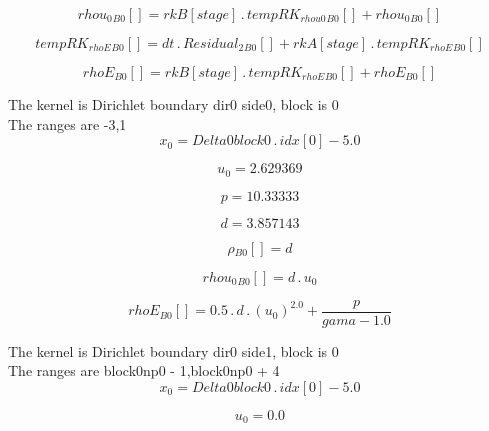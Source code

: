 \documentclass{article}
\begin{document}
\begin{dmath}{rhou_{0}{_{B0}}}[{}] = {rkB}[{stage}] \,.\, {tempRK_{rhou0}{_{B0}}}[{}] + {rhou_{0}{_{B0}}}[{}]\end{dmath}

\begin{dmath}{tempRK_{rhoE}{_{B0}}}[{}] = dt \,.\, {Residual_{2}{_{B0}}}[{}] + {rkA}[{stage}] \,.\, {tempRK_{rhoE}{_{B0}}}[{}]\end{dmath}

\begin{dmath}{rhoE{_{B0}}}[{}] = {rkB}[{stage}] \,.\, {tempRK_{rhoE}{_{B0}}}[{}] + {rhoE{_{B0}}}[{}]\end{dmath}

\noindent The kernel is Dirichlet boundary dir0 side0, block is 0\\\noindent The ranges are -3,1\\\begin{dmath}x_{0} = Delta0block0 \,.\, {idx}[{0}] - 5.0\end{dmath}

\begin{dmath}u_{0} = 2.629369\end{dmath}

\begin{dmath}p = 10.33333\end{dmath}

\begin{dmath}d = 3.857143\end{dmath}

\begin{dmath}{\rho{_{B0}}}[{}] = d\end{dmath}

\begin{dmath}{rhou_{0}{_{B0}}}[{}] = d \,.\, u_{0}\end{dmath}

\begin{dmath}{rhoE{_{B0}}}[{}] = 0.5 \,.\, d \,.\, \left(u_{0} \right)^{2.0} + \frac{p}{gama - 1.0}\end{dmath}

\noindent The kernel is Dirichlet boundary dir0 side1, block is 0\\\noindent The ranges are block0np0 - 1,block0np0 + 4\\\begin{dmath}x_{0} = Delta0block0 \,.\, {idx}[{0}] - 5.0\end{dmath}

\begin{dmath}u_{0} = 0.0\end{dmath}
\end{document}
